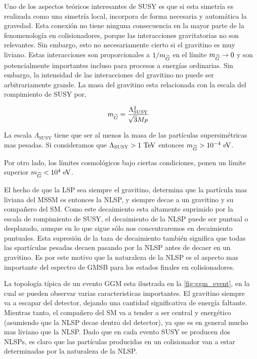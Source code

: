 Uno de los aspectos teóricos interesantes de SUSY es que si esta simetría es
realizada como una simetría local, incorpora de forma necesaria y automática la
gravedad. Esta conexión no tiene ninguna consecuencia en la mayor parte de la
fenomenología en colisionadores, porque las interacciones gravitatorias no son
relevantes. Sin embargo, esto no necesariamente cierto si el gravitino es muy
liviano.
Estas interacciones son proporcionales a $1/m_{\widetilde{G}}$ en el límite
$m_{\widetilde{G}} \rightarrow 0$ y son potencialmente importantes incluso para procesos a
energías ordinarias. Sin embargo, la intensidad de las interacciones del
gravitino no puede ser arbitrariamente grande. La masa del gravitino esta
relacionada con la escala del rompimiento de SUSY por,

\begin{equation}
  m_{\widetilde{G}} = \frac{\Lambda^2_{\text{SUSY}}}{\sqrt{3}M_P}
\end{equation}

La escala $\Lambda_{\text{SUSY}}$ tiene que ser al menos la masa de las
partículas supersimétricas mas pesadas. Si consideramos que
$\Lambda_{\text{SUSY}} > 1 \tev$ entonces $m_{\gravino} > 10^{-4} \eV$.

Por otro lado, los límites cosmológicos \cite{PhysRevLett.48.223,Moroi:1993mb}
bajo ciertas condiciones, ponen un límite superior $m_{\gravino} < 10^4 \eV$.%

El hecho de que la LSP sea siempre el gravitino, determina que la partícula mas
liviana del MSSM es entonces la NLSP, y siempre decae a un gravitino y su
compañero del SM. Como este decaimiento esta altamente suprimido por la escala
de rompimiento de SUSY, el decaimiento de la NLSP puede ser puntual o
desplazado, aunque en lo que sigue sólo nos concentraremos en decaimiento
puntuales. Esta supresión de la taza de decaimiento también significa que todas las
spartículas pesadas decaen pasando por la NLSP antes de decaer en un gravitino.
Es por este motivo que la naturaleza de la NLSP es el aspecto mas importante del
espectro de GMSB para los estados finales en colisionadores.


La topología típica de un evento GGM esta ilustrada en la
\cref{fig:ggm_event}, en la cual se pueden observar varias caracteristicas
importantes. El gravitino siempre va a escapar del detector, dejando una
cantidad significativa de energía faltante. Mientras tanto, el compañero del SM
va a tender a ser central y energético (asumiendo que la NLSP decae dentro del
detector), ya que es en general mucho mas liviano que la NLSP. Dado que en cada
evento SUSY se producen dos NLSPs, es claro que las partículas producidas en un
colisionador van a estar determinadas por la naturaleza de la NLSP.

